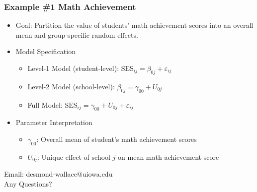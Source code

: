 \documentclass{beamer}
\begin{document}
\begin{frame}
	\frametitle{Example \#1 Math Achievement}
		\begin{itemize}
			\item Goal: Partition the value of students' math achievement scores into an overall mean and group-specific random effects.
			\item Model Specification
				\begin{itemize}
					\item Level-1 Model (student-level): $\mbox{SES}_{ij}=\beta_{0j}+\varepsilon_{ij}$
					\item Level-2 Model (school-level): $\beta_{0j}=\gamma_{00}+U_{0j}$
					\item Full Model: $\mbox{SES}_{ij}=\gamma_{00}+U_{0j}+\varepsilon_{ij}$
				\end{itemize}
			\item Parameter Interpretation
				\begin{itemize}
					\item $\gamma_{00}$: Overall mean of student's math achievement scores
					\item $U_{0j}$: Unique effect of school $j$ on mean math achievement score
				\end{itemize}
		\end{itemize}
\end{frame}

\begin{frame}
	\begin{center}
		\begin{LARGE}
			Email: desmond-wallace@uiowa.edu\\
			Any Questions?
		\end{LARGE}
	\end{center}
\end{frame}
\end{document}
